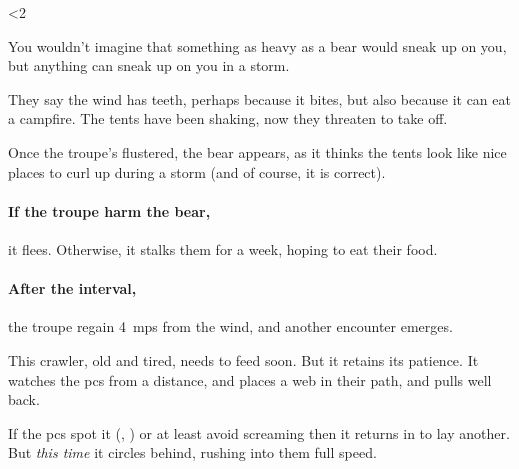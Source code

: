 \ifnum\value{temperature}<2

\bear


You wouldn't imagine that something as heavy as a bear would sneak up on you, but anything can sneak up on you in a storm.

\begin{boxtext}
  They say the wind has teeth, perhaps because it bites, but also because it can eat a campfire.
  The tents have been shaking, now they threaten to take off.
\end{boxtext}

Once the troupe's flustered, the bear appears, as it thinks the tents look like nice places to curl up during a storm (and of course, it is correct).

\paragraph{If the troupe harm the bear,}
it flees.
Otherwise, it stalks them for a week, hoping to eat their food.

\paragraph{After the \gls{interval},}
the troupe regain 4~\glspl{mp} from the wind, and another encounter emerges.

\else

\chitincrawler


This \gls{crawler}, old and tired, needs to feed soon.
But it retains its patience.
It watches the \glspl{pc} from a distance, and places a web in their path, and pulls well back.

If the \glspl{pc} spot it (, \tn[10]) or at least avoid screaming then it returns in  to lay another.
But \emph{this time} it circles behind, rushing into them full speed.


\fi
